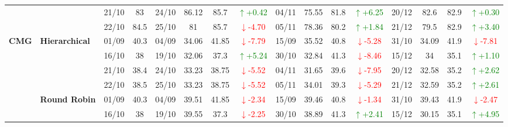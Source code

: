 {\begin{longtable}{llcc|cccc|cccc|cccc}
&
& 21/10 & 83 & 24/10 & 86.12 & 85.7 & \textcolor{green}{\(\uparrow\)+0.42} & 04/11 & 75.55 & 81.8 & \textcolor{green}{\(\uparrow\)+6.25} & 20/12 & 82.6 & 82.9 & \textcolor{green}{\(\uparrow\)+0.30} \\

&
& 22/10 & 84.5 & 25/10 & 81 & 85.7 & \textcolor{red}{\(\downarrow\)-4.70} & 05/11 & 78.36 & 80.2 & \textcolor{green}{\(\uparrow\)+1.84} & 21/12 & 79.5 & 82.9 & \textcolor{green}{\(\uparrow\)+3.40} \\




\midrule


\multirow{12}{*}{\textbf{CMG}} 
& \textbf{Hierarchical}
& 01/09 & 40.3 & 04/09 & 34.06 & 41.85 & \textcolor{red}{\(\downarrow\)-7.79} & 15/09 & 35.52 & 40.8 & \textcolor{red}{\(\downarrow\)-5.28} & 31/10 & 34.09 & 41.9 & \textcolor{red}{\(\downarrow\)-7.81} \\

& 
& 16/10 & 38 & 19/10 & 32.06 & 37.3 & \textcolor{green}{\(\uparrow\)+5.24} & 30/10 & 32.84 & 41.3 & \textcolor{red}{\(\downarrow\)-8.46} & 15/12 & 34 & 35.1 & \textcolor{green}{\(\uparrow\)+1.10} \\

& 
& 21/10 & 38.4 & 24/10 & 33.23 & 38.75 & \textcolor{red}{\(\downarrow\)-5.52} & 04/11 & 31.65 & 39.6 & \textcolor{red}{\(\downarrow\)-7.95} & 20/12 & 32.58 & 35.2 & \textcolor{green}{\(\uparrow\)+2.62} \\

&
& 22/10 & 38.5 & 25/10 & 33.23 & 38.75 & \textcolor{red}{\(\downarrow\)-5.52} & 05/11 & 34.01 & 39.3 & \textcolor{red}{\(\downarrow\)-5.29} & 21/12 & 32.59 & 35.2 & \textcolor{green}{\(\uparrow\)+2.61} \\
\cmidrule(lr){2-16}


& \textbf{Round Robin}
& 01/09 & 40.3 & 04/09 & 39.51 & 41.85 & \textcolor{red}{\(\downarrow\)-2.34} & 15/09 & 39.46 & 40.8 & \textcolor{red}{\(\downarrow\)-1.34} & 31/10 & 39.43 & 41.9 & \textcolor{red}{\(\downarrow\)-2.47} \\

& 
& 16/10 & 38 & 19/10 & 39.55 & 37.3 & \textcolor{red}{\(\downarrow\)-2.25} & 30/10 & 38.89 & 41.3 & \textcolor{green}{\(\uparrow\)+2.41} & 15/12 & 30.15 & 35.1 & \textcolor{green}{\(\uparrow\)+4.95} \\


\end{longtable}}
